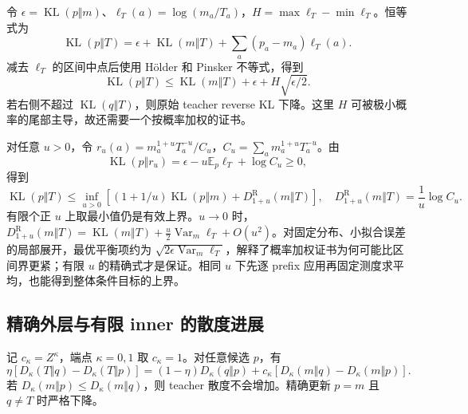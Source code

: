 \documentclass[lang=cn,scheme=chinese,openany]{../book/elegantbook}
\newcommand{\E}{\mathbb E}
\newcommand{\KL}{\operatorname{KL}}
\newcommand{\Var}{\operatorname{Var}}
\begin{document}
令 $\epsilon=\KL(p\Vert m)$、$\ell_T(a)=\log(m_a/T_a)$，$H=\max \ell_T-\min \ell_T$。恒等式为
\begin{equation}
 \KL(p\Vert T)=\epsilon+\KL(m\Vert T)+\sum_a(p_a-m_a)\ell_T(a).
\end{equation}
减去 $\ell_T$ 的区间中点后使用 Hölder 和 Pinsker 不等式，得到
\begin{equation}
 \KL(p\Vert T)\le\KL(m\Vert T)+\epsilon+H\sqrt{\epsilon/2}.
 \label{eq:proximal-range-certificate}
\end{equation}
若右侧不超过 $\KL(q\Vert T)$，则原始 teacher reverse KL 下降。这里 $H$ 可被极小概率的尾部主导，故还需要一个按概率加权的证书。

对任意 $u>0$，令 $r_u(a)=m_a^{1+u}T_a^{-u}/C_u$，$C_u=\sum_am_a^{1+u}T_a^{-u}$。由
\begin{equation}
 \KL(p\Vert r_u)=\epsilon-u\E_p\ell_T+\log C_u\ge0,
\end{equation}
得到
\begin{equation}
 \boxed{\KL(p\Vert T)\le
 \inf_{u>0}\left[(1+1/u)\KL(p\Vert m)+D_{1+u}^{\mathrm R}(m\Vert T)\right]},\quad
 D_{1+u}^{\mathrm R}(m\Vert T)=\frac1u\log C_u.
 \label{eq:proximal-renyi-certificate}
\end{equation}
有限个正 $u$ 上取最小值仍是有效上界。$u\to0$ 时，$D_{1+u}^{\mathrm R}(m\Vert T)=\KL(m\Vert T)+\tfrac u2\Var_m\ell_T+O(u^2)$。对固定分布、小拟合误差的局部展开，最优平衡项约为 $\sqrt{2\epsilon\Var_m\ell_T}$，解释了概率加权证书为何可能比区间界更紧；有限 $u$ 的精确式才是保证。相同 $u$ 下先逐 prefix 应用再固定测度求平均，也能得到整体条件目标的上界。



\subsection{精确外层与有限 inner 的散度进展}

\begin{theorem}
\label{thm:proximal-teacher-progress}
记 $c_\kappa=Z^\kappa$，端点 $\kappa=0,1$ 取 $c_\kappa=1$。对任意候选 $p$，有
\begin{equation}
 \eta\left[D_\kappa(T\Vert q)-D_\kappa(T\Vert p)\right]
 =(1-\eta)D_\kappa(q\Vert p)
 +c_\kappa\left[D_\kappa(m\Vert q)-D_\kappa(m\Vert p)\right].
 \label{eq:proximal-progress-identity}
\end{equation}
若 $D_\kappa(m\Vert p)\le D_\kappa(m\Vert q)$，则 teacher 散度不会增加。精确更新 $p=m$ 且 $q\ne T$ 时严格下降。
\end{theorem}
\end{document}
